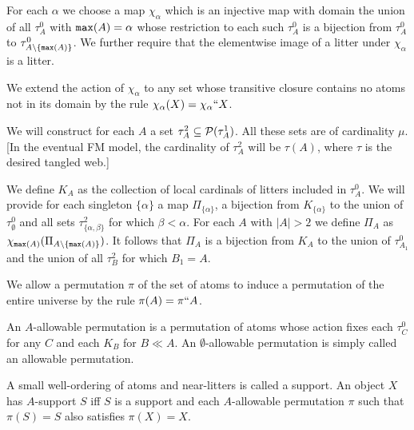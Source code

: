 \documentclass{slides}
\begin{document}
\begin{slide}

For each $\alpha$ we choose a map $\chi_\alpha$ which is an injective map with domain the union of all $\tau^0_A$ with ${\tt max}(A)=\alpha$ whose restriction
to each such $\tau^0_A$ is a bijection from $\tau^0_A$ to $\tau^0_{A\setminus \{{\tt max}(A)\}}$.  We further require that the elementwise image of a litter under $\chi_\alpha$ is a litter.

We extend the action of $\chi_\alpha$ to any set whose transitive closure contains no atoms not in its domain by the rule $\chi_\alpha(X) = \chi_\alpha``X$.

\end{slide}

\begin{slide}

We will construct for each $A$ a set $\tau^2_A \subseteq {\cal P}(\tau^1_A)$.  All these sets are of cardinality $\mu$.   [In the eventual FM model, the cardinality of $\tau^2_A$ will be $\tau(A)$, where $\tau$ is the desired tangled web.]

We define $K_A$ as the collection of local cardinals of litters included in $\tau^0_A$.  We will provide for each singleton $\{\alpha\}$ a map $\Pi_{\{\alpha\}}$, a bijection from $K_{\{\alpha\}}$ to the union of
$\tau^0_{\emptyset}$ and all sets $\tau^2_{\{\alpha,\beta\}}$ for which $\beta<\alpha$.  For each $A$ with $|A|>2$ we define $\Pi_A$ as $\chi_{{\tt max}(A)}(\Pi_{A \setminus \{{\tt max}(A)\}})$.  It follows that $\Pi_A$ is a bijection from $K_A$ to the union of $\tau^0_{A_1}$ and the union of all $\tau^2_B$ for which $B_1=A$.

\end{slide}

\begin{slide}

We allow a permutation $\pi$ of the set of atoms to induce a permutation of the entire universe by the rule $\pi(A) =\pi``A$.

An $A$-allowable permutation is a permutation of atoms whose action fixes each $\tau^0_C$ for any $C$ and each $K_B$ for $B \ll A$.  An $\emptyset$-allowable permutation
is simply called an allowable permutation.

A small well-ordering of atoms and near-litters is called a support.  An object $X$ has $A$-support $S$ iff $S$ is a support and each $A$-allowable permutation $\pi$ such that $\pi(S)=S$ also
satisfies $\pi(X)=X$.

\end{slide}
\end{document}
